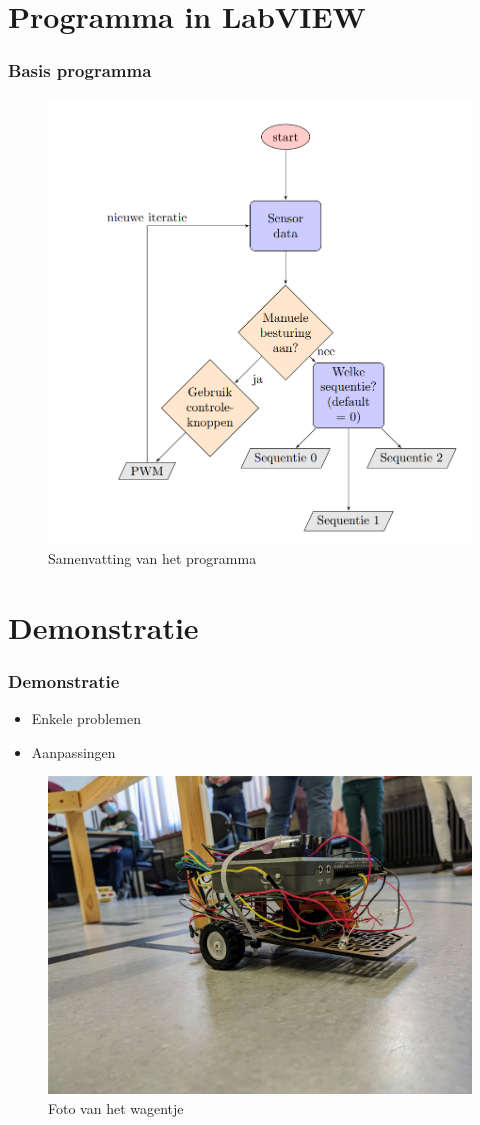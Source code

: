 \documentclass
   [kulak] %
   {kulakbeamer}
\begin{document}
\section[Programma]{Programma in LabVIEW}

\begin{frame}
	\frametitle{Basis programma}
	\begin{figure}
		\centering
		\includegraphics[width=.5\textwidth,]{flowchartBegin}
		\caption{Samenvatting van het programma}
	\end{figure}
\end{frame}


\section{Demonstratie}

\begin{frame}
	\frametitle{Demonstratie}
	\begin{itemize}
		\item Enkele problemen
		\item Aanpassingen
	\end{itemize}
	\begin{figure}
		\centering
		\includegraphics[width=.5\textwidth]{fotowagen}
		\caption{Foto van het wagentje}
	\end{figure}
\end{frame}
\end{document}
